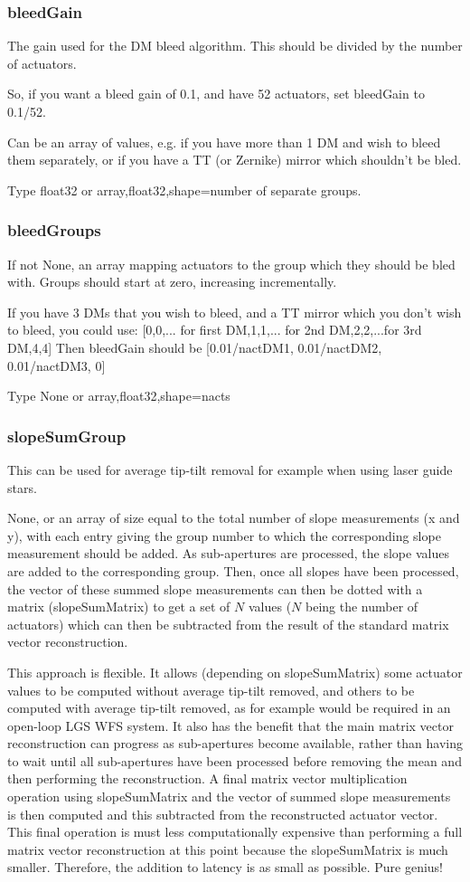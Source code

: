 \documentclass[a4,10pt]{article}
\begin{document}
\subsubsection{bleedGain}
The gain used for the DM bleed algorithm.  This should be divided by
the number of actuators.

So, if you want a bleed gain of 0.1, and have 52 actuators, set
bleedGain to 0.1/52.

Can be an array of values, e.g. if you have more than 1 DM and wish to
bleed them separately, or if you have a TT (or Zernike) mirror which
shouldn't be bled.

Type float32 or array,float32,shape=number of separate groups.

\subsubsection{bleedGroups}
If not None, an array mapping actuators to the group which they should
be bled with.  Groups should start at zero, increasing incrementally.

If you have 3 DMs that you wish to bleed, and a TT mirror which you
don't wish to bleed, you could use:
[0,0,... for first DM,1,1,... for 2nd DM,2,2,...for 3rd DM,4,4]
Then bleedGain should be [0.01/nactDM1, 0.01/nactDM2, 0.01/nactDM3, 0]

Type None or array,float32,shape=nacts

\subsubsection{slopeSumGroup}
This can be used for average tip-tilt removal for example when using
laser guide stars.

None, or an array of size equal to the total number of slope
measurements (x and y), with each entry giving the group number to
which the corresponding slope measurement should be added.  As
sub-apertures are processed, the slope values are added to the
corresponding group.  Then, once all slopes have been processed, the
vector of these summed slope measurements can then be dotted with a
matrix (slopeSumMatrix) to get a set of $N$ values ($N$ being the
number of actuators) which can then be subtracted from the result of
the standard matrix vector reconstruction.

This approach is flexible.  It allows (depending on slopeSumMatrix)
some actuator values to be computed without average tip-tilt removed,
and others to be computed with average tip-tilt removed, as for
example would be required in an open-loop LGS WFS system.  It also has
the benefit that the main matrix vector reconstruction can progress as
sub-apertures become available, rather than having to wait until all
sub-apertures have been processed before removing the mean and then
performing the reconstruction.  A final matrix vector multiplication
operation using slopeSumMatrix and the vector of summed slope
measurements is then computed and this subtracted from the
reconstructed actuator vector.  This final operation is must less
computationally expensive than performing a full matrix vector
reconstruction at this point because the slopeSumMatrix is much
smaller.  Therefore, the addition to latency is as small as possible.
Pure genius!
\end{document}
